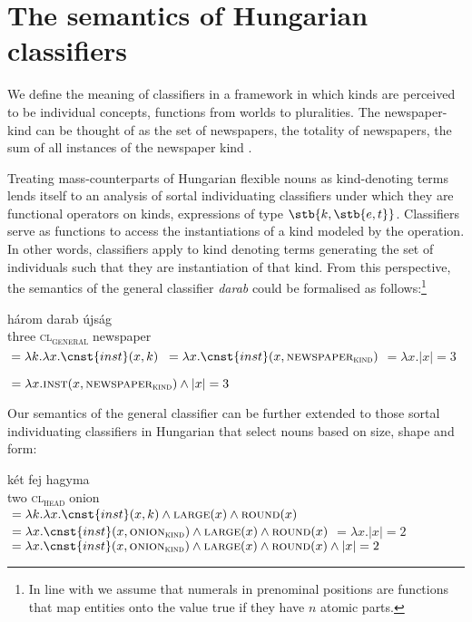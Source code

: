 \documentclass[output=paper]{langscibook}
\begin{document}
\section{The semantics of Hungarian classifiers} \label{schv-nem:sec:5}

We define the meaning of classifiers in a framework in which kinds are perceived to be individual concepts, functions from worlds to pluralities. The newspaper-kind can be thought of as the set of newspapers, the totality of newspapers, the sum of all instances of the newspaper kind \citep{chierchia-98b}. 

Treating mass-counterparts of Hungarian flexible nouns as kind-denoting terms lends itself to an analysis of sortal individuating classifiers under which they are functional operators on kinds, expressions of type  $\stb{k,\stb{e,t}}$. Classifiers serve as functions to access the instantiations of a kind modeled by the  operation. In other words, classifiers apply to kind denoting terms generating the set of individuals such that they are instantiation of that kind.  From this perspective, the semantics of the general classifier \textit{darab} could be formalised as follows:\footnote{In line with \citet{rothstein17} we assume that numerals in prenominal positions are functions that map entities onto the value true if they have $n$ atomic parts.

}
 

\ea \label{schv-nem:ex:50}
\ea
\gll három darab újság \\
three \textsc{cl\textsubscript{general}} newspaper\\
\ex {}${} = \lambda k. \lambda x.\cnst{inst}(x,k)$
\ex {}${} = \lambda x.\cnst{inst}(x,\textsc{newspaper}_{\textsc{kind}})$
\ex {}${} = \lambda x.  |x| =3$ %


\ex {}${} =  \lambda x.\textsc{inst}(x,\textsc{newspaper}_{\textsc{kind}}) \wedge |x| =3$
\z
\z


\noindent  Our semantics of the general classifier can be further extended to those sortal individuating classifiers in Hungarian that select nouns based on size, shape and form:

\ea \label{schv-nem:ex:51}
\ea
\gll két fej hagyma \\
two \textsc{cl\textsubscript{head}} onion\\
\ex {}${} = \lambda k. \lambda x.\cnst{inst}(x,k) \wedge \textsc{large}(x) \wedge \textsc{round}(x)$
\ex {}${} = \lambda x.\cnst{inst}(x,\textsc{onion}_{\textsc{kind}}) \wedge \textsc{large}(x) \wedge \textsc{round}(x)$
\ex {}${} = \lambda x.  |x| =2$
\ex {}\\${} =  \lambda x.\cnst{inst}(x,\textsc{onion}_{\textsc{kind}})\wedge \textsc{large}(x) \wedge \textsc{round}(x) \wedge |x| =2$
\z
\z
\end{document}
